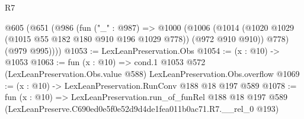 \begin{lexlean}{R7}
\begin{coremodule}
  @605
    (@651
      (@986
        (fun ("_" : @987) =>
        @1000
          (@1006
            (@1014 (@1020 @1029 (@1015 @55 @182 @180 @910 @196 @1029 @778)) (@972 @910 @910))
            @778)
          (@979 @995))))
@1053 := LexLeanPreservation.Obs
@1054 := (x : @10) -> @1053
@1063 := fun (x : @10) =>
  cond.{1} @1053 @572 (LexLeanPreservation.Obs.value @588) LexLeanPreservation.Obs.overflow
@1069 := (x : @10) -> LexLeanPreservation.RunConv @188 @18 @197 @589
@1078 := fun (x : @10) =>
  LexLeanPreservation.run_of_funRel
    @188
    @18
    @197
    @589
    (LexLeanPreserve.C690ed0e5f0e52d9d4de1fea011b0ac71.R7.__rel_0 @193)
\end{coremodule}
\end{lexlean}
